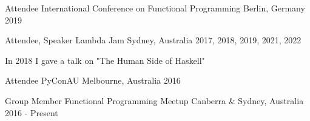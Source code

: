 


\begin{cventries}


\cventry
{Attendee} %
{International Conference on Functional Programming} %
{Berlin, Germany} %
{2019} %
{ %
\begin{cvitems}
\end{cvitems}
}

\vspace{-4.0mm}


\cventry
{Attendee, Speaker} %
{Lambda Jam} %
{Sydney, Australia} %
{2017, 2018, 2019, 2021, 2022} %
{ %
\begin{cvitems}
  \item {In 2018 I gave a talk on "The Human Side of Haskell"}
\end{cvitems}
}




\cventry
{Attendee} %
{PyConAU} %
{Melbourne, Australia} %
{2016} %
{ %
\begin{cvitems}
\end{cvitems}
}

\vspace{-4.0mm}


\cventry
{Group Member} %
{Functional Programming Meetup} %
{Canberra \& Sydney, Australia} %
{2016 - Present} %
{ %
\begin{cvitems}
\end{cvitems}
}


\end{cventries}
